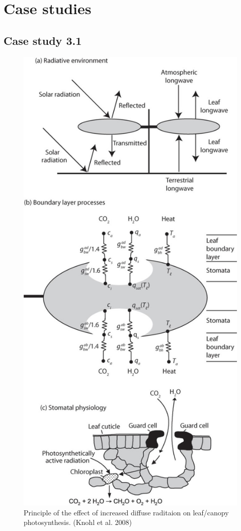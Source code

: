 \documentclass[12pt,oneside]{book}
\begin{document}
\section{Case studies}\label{case-studies-1}

\subsection{Case study 3.1}\label{case-study-3.1}

\begin{figure}

{\centering \includegraphics[width=0.8\linewidth]{figures/chap3/f331_leaf_E_balance} 

}

\caption{Principle of the effect of increased diffuse raditaion on leaf/canopy photosynthesis. (Knohl et al. 2008)}\label{fig:f332}
\end{figure}
\end{document}

